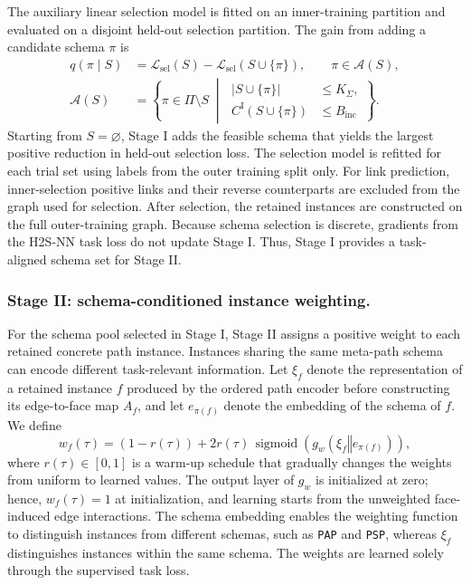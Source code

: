 \documentclass[sigconf,anonymous,review]{acmart}
\newcommand{\method}{\textsc{H2S-NN}}
\newcommand{\cL}{\mathcal{L}}
\newcommand{\concat}{\mathbin\Vert}
\begin{document}
The auxiliary linear selection model is fitted on an inner-training
partition and evaluated on a disjoint held-out selection partition. The
gain from adding a candidate schema \(\pi\) is
\begin{equation}
\begin{aligned}
q(\pi \mid S)
&=
\cL_{\mathrm{sel}}(S)
-
\cL_{\mathrm{sel}}(S\cup\{\pi\}),
\qquad
\pi \in \mathcal{A}(S),
\\[3pt]
\mathcal{A}(S)
&=
\left\{
\pi \in \Pi \setminus S
\;\middle|\;
\begin{aligned}
|S\cup\{\pi\}| &\le K_\Sigma,\\
C^{\mathrm{I}}(S\cup\{\pi\}) &\le B_{\mathrm{inc}}
\end{aligned}
\right\}.
\end{aligned}
\label{eq:selection-gain}
\end{equation}
Starting from \(S=\varnothing\), Stage I adds the feasible schema that yields
the largest positive reduction in held-out selection loss. The selection
model is refitted for each trial set using labels from the outer training
split only. For link prediction, inner-selection positive links and their
reverse counterparts are excluded from the graph used for selection. After
selection, the retained instances are constructed on the full outer-training
graph. Because schema selection is discrete, gradients from the \method{}
task loss do not update Stage I. Thus, Stage I provides a task-aligned
schema set for Stage II.

\subsubsection{Stage II: schema-conditioned instance weighting.}
For the schema pool selected in Stage I, Stage II assigns a positive weight
to each retained concrete path instance. Instances sharing the same meta-path
schema can encode different task-relevant information. Let \(\xi_f\) denote
the representation of a retained instance \(f\) produced by the ordered path
encoder before constructing its edge-to-face map \(A_f\), and let
\(e_{\pi(f)}\) denote the embedding of the schema of \(f\). We define
\begin{equation}
  w_f(\tau)
  =
  (1-r(\tau))
  +
  2r(\tau)\,
  \operatorname{sigmoid}\!\left(
    g_w(\xi_f\concat e_{\pi(f)})
  \right),
  \label{eq:instance-weight}
\end{equation}
where \(r(\tau)\in[0,1]\) is a warm-up schedule that gradually changes the weights from uniform to learned values. The output layer of \(g_w\) is
initialized at zero; hence, \(w_f(\tau)=1\) at initialization, and learning
starts from the unweighted face-induced edge interactions. The schema embedding enables
the weighting function to distinguish instances from different schemas, such
as \texttt{PAP} and \texttt{PSP}, whereas \(\xi_f\) distinguishes instances
within the same schema. The weights are learned solely through the supervised
task loss.
\end{document}
